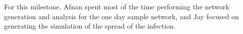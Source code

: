 \documentclass[times, 10pt,twocolumn]{article}
\begin{document}
For this milestone, Afnan spent most of the time performing the network generation and analysis for the one day sample network, and Jay focused on generating the simulation of the spread of the infection.








\end{document}
